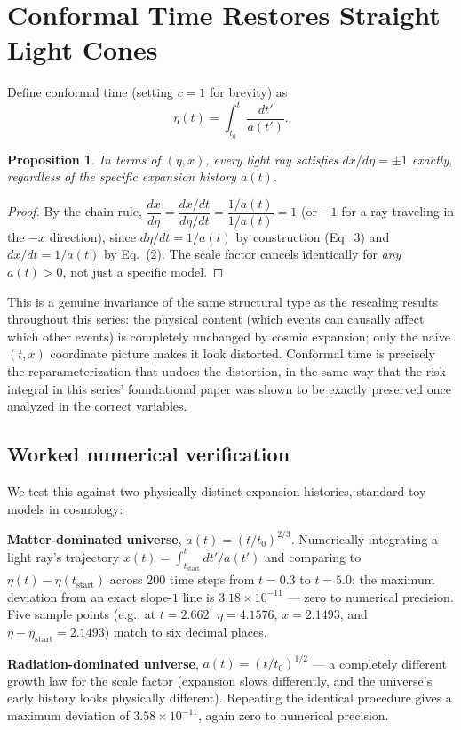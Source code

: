 \documentclass[10pt,journal,compsoc]{IEEEtran}
\newtheorem{proposition}{Proposition}
\begin{document}
\section{Conformal Time Restores Straight Light Cones}
Define conformal time (setting $c=1$ for brevity) as
\begin{equation}
    \eta(t) = \int_{t_0}^{t} \frac{dt'}{a(t')}.
\end{equation}

\begin{proposition}
In terms of $(\eta,x)$, every light ray satisfies $dx/d\eta = \pm 1$ exactly, regardless of the specific expansion history $a(t)$.
\end{proposition}
\begin{proof}
By the chain rule, $\dfrac{dx}{d\eta} = \dfrac{dx/dt}{d\eta/dt} = \dfrac{1/a(t)}{1/a(t)} = 1$ (or $-1$ for a ray traveling in the $-x$ direction), since $d\eta/dt = 1/a(t)$ by construction (Eq.~3) and $dx/dt=1/a(t)$ by Eq.~(2). The scale factor cancels identically for \emph{any} $a(t)>0$, not just a specific model.
\end{proof}
This is a genuine invariance of the same structural type as the rescaling results throughout this series: the physical content (which events can causally affect which other events) is completely unchanged by cosmic expansion; only the naive $(t,x)$ coordinate picture makes it look distorted. Conformal time is precisely the reparameterization that undoes the distortion, in the same way that the risk integral in this series' foundational paper was shown to be exactly preserved once analyzed in the correct variables.

\subsection{Worked numerical verification}
We test this against two physically distinct expansion histories, standard toy models in cosmology:

\textbf{Matter-dominated universe}, $a(t) = (t/t_0)^{2/3}$. Numerically integrating a light ray's trajectory $x(t) = \int_{t_{\text{start}}}^{t} dt'/a(t')$ and comparing to $\eta(t)-\eta(t_{\text{start}})$ across $200$ time steps from $t=0.3$ to $t=5.0$: the maximum deviation from an exact slope-$1$ line is $3.18\times10^{-11}$ — zero to numerical precision. Five sample points (e.g., at $t=2.662$: $\eta=4.1576$, $x=2.1493$, and $\eta-\eta_{\text{start}}=2.1493$) match to six decimal places.

\textbf{Radiation-dominated universe}, $a(t)=(t/t_0)^{1/2}$ — a completely different growth law for the scale factor (expansion slows differently, and the universe's early history looks physically different). Repeating the identical procedure gives a maximum deviation of $3.58\times10^{-11}$, again zero to numerical precision.
\end{document}
